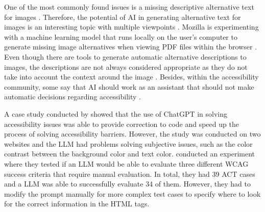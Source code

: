 One of the most commonly found issues is a missing descriptive alternative text for images \citep{webaimmillions, dequecoverage}. Therefore, the potential of AI in generating alternative text for images is an interesting topic with multiple viewpoints \citep{ai_wcag_email, boia_alt_text, potential_for_ai}. Mozilla is experimenting with a machine learning model that runs locally on the user's computer to generate missing image alternatives when viewing PDF files within the browser \citep{alt_image_mozilla}. Even though there are tools to generate automatic alternative descriptions to images, the descriptions are not always considered appropriate as they do not take into account the context around the image \citep{accessibility_and_ai, boia_alt_text}. Besides, within the accessibility community, some say that AI should work as an assistant that should not make automatic decisions regarding accessibility \citep{ai_wcag_email, accessibility_and_ai}.

A case study conducted by \textcite{10.1145/3594806.3596542_case_study_gpt} showed that the use of ChatGPT in solving accessibility issues was able to provide correction to code and speed up the process of solving accessibility barriers. However, the study was conducted on two websites and the LLM had problems solving subjective issues, such as the color contrast between the background color and text color. \textcite{Lopez2024Turning} conducted an experiment where they tested if an LLM would be able to evaluate three different WCAG success criteria that require manual evaluation. In total, they had 39 ACT cases and a LLM was able to successfully evaluate 34 of them. However, they had to modify the prompt manually for more complex test cases to specify where to look for the correct information in the HTML tags.

